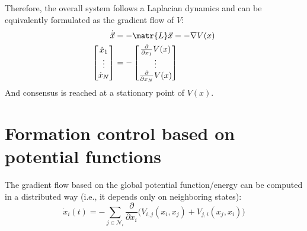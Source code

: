 \begin{description}
        Therefore, the overall system follows a Laplacian dynamics and can be equivalently formulated as the gradient flow of $V$:
        \[
            \begin{split}
                \dot{\x} &= -\matr{L}\x = - \nabla V(x) \\
                \begin{bmatrix}
                    \dot{x}_1 \\ \vdots \\ \dot{x}_N
                \end{bmatrix}
                &=
                - \begin{bmatrix}
                    \frac{\partial}{\partial x_1} V(x) \\
                    \vdots
                    \\
                    \frac{\partial}{\partial x_N} V(x)
                \end{bmatrix}
            \end{split}
        \]
        And consensus is reached at a stationary point of $V(x)$.
\end{description}



\section{Formation control based on potential functions}


\begin{remark}
    The gradient flow based on the global potential function/energy can be computed in a distributed way (i.e., it depends only on neighboring states):
    \[
        \dot{x}_i(t) = - \sum_{j \in \mathcal{N}_i} \frac{\partial}{\partial x_i} \Big( V_{i,j}(x_i, x_j) + V_{j,i}(x_j, x_i) \Big)
    \]
\end{remark}



